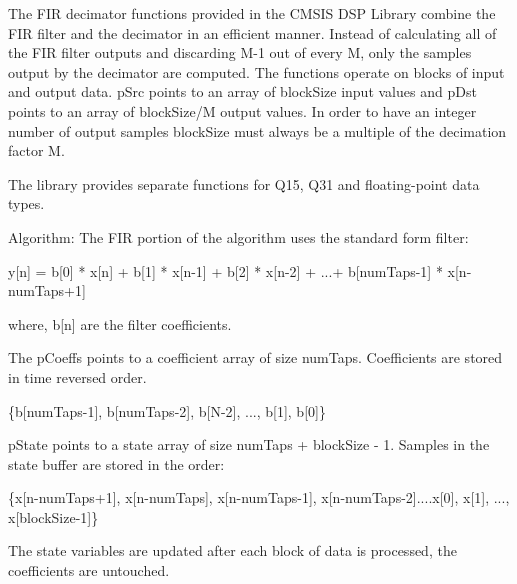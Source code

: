 The F\-I\-R decimator functions provided in the C\-M\-S\-I\-S D\-S\-P Library combine the F\-I\-R filter and the decimator in an efficient manner. Instead of calculating all of the F\-I\-R filter outputs and discarding {\ttfamily M-\/1} out of every {\ttfamily M}, only the samples output by the decimator are computed. The functions operate on blocks of input and output data. {\ttfamily p\-Src} points to an array of {\ttfamily block\-Size} input values and {\ttfamily p\-Dst} points to an array of {\ttfamily block\-Size/\-M} output values. In order to have an integer number of output samples {\ttfamily block\-Size} must always be a multiple of the decimation factor {\ttfamily M}.

The library provides separate functions for Q15, Q31 and floating-\/point data types.

\begin{DoxyParagraph}{Algorithm\-: }
The F\-I\-R portion of the algorithm uses the standard form filter\-: 
\begin{DoxyPre}    
     y[n] = b[0] * x[n] + b[1] * x[n-1] + b[2] * x[n-2] + ...+ b[numTaps-1] * x[n-numTaps+1]    
  \end{DoxyPre}
 where, {\ttfamily b\mbox{[}n\mbox{]}} are the filter coefficients. 
\end{DoxyParagraph}
\begin{DoxyParagraph}{}
The {\ttfamily p\-Coeffs} points to a coefficient array of size {\ttfamily num\-Taps}. Coefficients are stored in time reversed order. 
\end{DoxyParagraph}
\begin{DoxyParagraph}{}

\begin{DoxyPre}    
     \{b[numTaps-1], b[numTaps-2], b[N-2], ..., b[1], b[0]\}    
  \end{DoxyPre}
 
\end{DoxyParagraph}
\begin{DoxyParagraph}{}
{\ttfamily p\-State} points to a state array of size {\ttfamily num\-Taps + block\-Size -\/ 1}. Samples in the state buffer are stored in the order\-: 
\end{DoxyParagraph}
\begin{DoxyParagraph}{}

\begin{DoxyPre}    
     \{x[n-numTaps+1], x[n-numTaps], x[n-numTaps-1], x[n-numTaps-2]....x[0], x[1], ..., x[blockSize-1]\}    
  \end{DoxyPre}
 The state variables are updated after each block of data is processed, the coefficients are untouched.
\end{DoxyParagraph}
